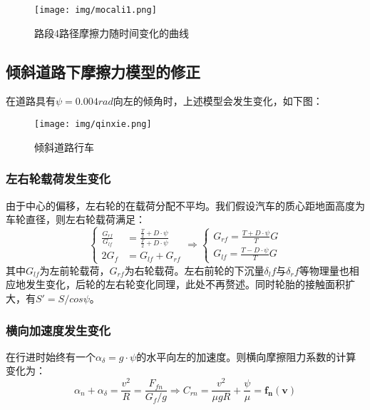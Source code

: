 \documentclass[withoutpreface,bwprint]{cumcmthesis} %
\begin{document}
\begin{figure}[htbp]
    \centering
    \texttt{[image: img/mocali1.png]}
     \captionsetup{font=small, position=below}
    \caption{路段4路径摩擦力随时间变化的曲线}
\end{figure}


\subsection{倾斜道路下摩擦力模型的修正}



在道路具有$\psi=0.004rad$向左的倾角时，上述模型会发生变化，如下图：
\begin{figure}[htbp]
    \centering
    \texttt{[image: img/qinxie.png]}
     \captionsetup{font=small, position=below}
    \caption{倾斜道路行车}
\end{figure}

\subsubsection{左右轮载荷发生变化}



由于中心的偏移，左右轮的在载荷分配不平均。我们假设汽车的质心距地面高度为车轮直径，则左右轮载荷满足：
\begin{equation}
\label{singleV}
    \left\{
\begin{aligned}
\frac{G_{rf}}{G_{lf}} &=\frac{\frac{T}{2} + D\cdot \psi}{\frac{T}{2} + D\cdot \psi}\\
2G_f &=G_{lf}+G_{rf}
\end{aligned}
\right.
\Longrightarrow
    \left\{
\begin{aligned}
G_{rf}=\frac{T+D\cdot \psi}{T}G\\
G_{lf}=\frac{T-D\cdot \psi}{T}G
\end{aligned}
\right.
\end{equation}
其中$G_{lf}$为左前轮载荷，$G_{rf}$为右轮载荷。左右前轮的下沉量$\delta_lf$与$\delta_rf$等物理量也相应地发生变化，后轮的左右轮变化同理，此处不再赘述。同时轮胎的接触面积扩大，有$S'=S/cos\psi$。



\subsubsection{横向加速度发生变化}



在行进时始终有一个$\alpha_\delta=g \cdot \psi$的水平向左的加速度。则横向摩擦阻力系数的计算变化为：
\begin{equation}
    \alpha_n + \alpha_\delta= \frac{v^2}{R} = \frac{F_{fn}}{G_f/g} \Longrightarrow C_{rn} = \frac{v^2}{\mu g R}+\frac{\psi}{\mu} = \mathbf{f_n(v)}
\end{equation}
\end{document}
